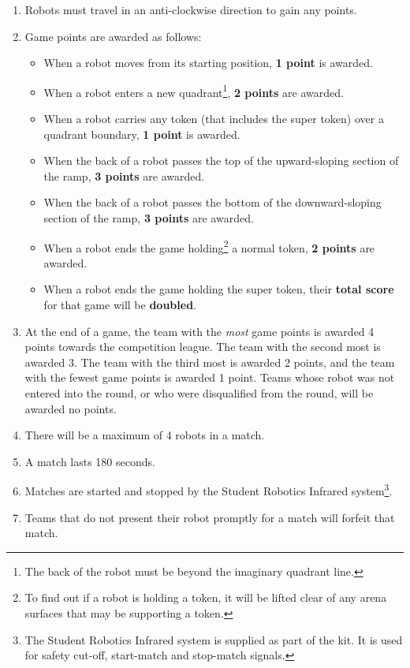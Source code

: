 \begin{enumerate}
\item Robots must travel in an anti-clockwise direction to gain any points.

\item Game points are awarded as follows:

\begin{itemize}
\item When a robot moves from its starting position, \textbf{1 point} is awarded.
\item When a robot enters a new quadrant\footnote{The back of the robot must be beyond the imaginary quadrant line.}, \textbf{2 points} are awarded.
\item When a robot carries any token (that includes the super token) over a quadrant boundary, \textbf{1 point} is awarded.
\item When the back of a robot passes the top of the upward-sloping section of the ramp, \textbf{3 points} are awarded.
\item When the back of a robot passes the bottom of the downward-sloping section of the ramp, \textbf{3 points} are awarded.
\item When a robot ends the game holding\footnote{To find out if a robot is holding a token, it will be lifted clear of any arena surfaces that may be supporting a token.} a normal token, \textbf{2 points} are awarded.
\item When a robot ends the game holding the super token, their \textbf{total score} for that game will be \textbf{doubled}.
\end{itemize}

\item At the end of a game, the team with the \emph{most} game points is awarded 4 points towards the competition league.
 The team with the second most is awarded 3.
 The team with the third most is awarded 2 points, and the team with the fewest game points is awarded 1 point.
 Teams whose robot was not entered into the round, or who were disqualified from the round, will be awarded no points.

\item There will be a maximum of 4 robots in a match.
\item A match lasts 180 seconds.
\item Matches are started and stopped by the Student Robotics Infrared system\footnote{The Student Robotics Infrared system is supplied as part of the kit. It is used for safety cut-off, start-match and stop-match signals.}.
\item Teams that do not present their robot promptly for a match will forfeit that match.
\end{enumerate}
